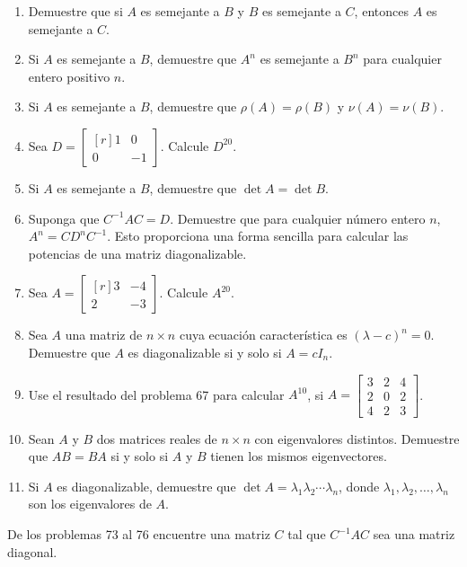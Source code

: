 \begin{enumerate}[start=62]
    \item Demuestre que si $A$ es semejante a $B$ y $B$ es semejante a $C$, entonces $A$ es semejante a $C$.
    \item Si $A$ es semejante a $B$, demuestre que $A^{n}$ es semejante a $B^{n}$ para cualquier entero positivo $n$.
    \item Si $A$ es semejante a $B$, demuestre que $\rho(A)=\rho(B)$ y $\nu(A)=\nu(B)$.
    \item Sea $D=\begin{bmatrix*}[r]1 & 0 \\ 0 & -1\end{bmatrix*}$. Calcule $D^{20}$.
    \item Si $A$ es semejante a $B$, demuestre que $\operatorname{det} A=\operatorname{det} B$.
    \item Suponga que $C^{-1} A C=D$. Demuestre que para cualquier número entero $n$, $A^{n}=C D^{n} C^{-1}$. Esto proporciona una forma sencilla para calcular las potencias de una matriz diagonalizable.
    \item Sea $A=\begin{bmatrix*}[r]3 & -4 \\ 2 & -3\end{bmatrix*}$. Calcule $A^{20}$.
    \item Sea $A$ una matriz de $n \times n$ cuya ecuación característica es $(\lambda-c)^{n}=0$. Demuestre que $A$ es diagonalizable si y solo si $A=c I_n$.\newpage
    \item Use el resultado del problema 67 para calcular $A^{10}$, si $A=\begin{bmatrix}3 & 2 & 4 \\ 2 & 0 & 2 \\ 4 & 2 & 3\end{bmatrix}$.
    \item Sean $A$ y $B$ dos matrices reales de $n \times n$ con eigenvalores distintos. Demuestre que $A B=B A$ si y solo si $A$ y $B$ tienen los mismos eigenvectores.
    \item Si $A$ es diagonalizable, demuestre que $\operatorname{det} A=\lambda_{1} \lambda_{2} \cdots \lambda_{n}$, donde $\lambda_{1}, \lambda_{2}, \dots, \lambda_{n}$ son los eigenvalores de $A$.
\end{enumerate}
De los problemas 73 al 76 encuentre una matriz $C$ tal que $C^{-1} A C$ sea una matriz diagonal.
\begin{multienumerate}
    \setcounter{multienumi}{72}
\end{multienumerate}
